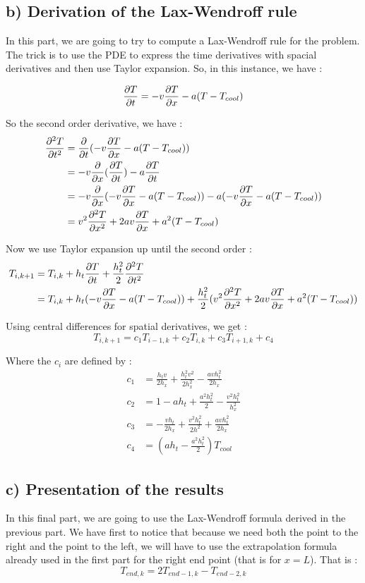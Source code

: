 \subsection*{b) Derivation of the Lax-Wendroff rule}
In this part, we are going to try to compute a Lax-Wendroff rule for the problem. The trick is to use the PDE to express the time derivatives with spacial derivatives and then use Taylor expansion. So, in this instance, we have :

$$\frac{\partial T}{\partial t}=-v\frac{\partial T}{\partial x}-a(T-T_{cool})$$

So the second order derivative, we have :
\begin{align*}
\frac{\partial^2T}{\partial t^2} &= \frac{\partial}{\partial t}( -v\frac{\partial T}{\partial x}-a(T-T_{cool}))\\
&=-v\frac{\partial}{\partial x}(\frac{\partial T}{\partial t})-a\frac{\partial T}{\partial t}\\
&=-v\frac{\partial}{\partial x}(-v\frac{\partial T}{\partial x}-a(T-T_{cool})) - a(-v\frac{\partial T}{\partial x}-a(T-T_{cool}))\\
&=v^2\frac{\partial^2 T}{\partial x^2}+2av\frac{\partial T}{\partial x}+a^2(T-T_{cool})
\end{align*}

Now we use Taylor expansion up until the second order : 
\begin{align*}
T_{i,k+1} &= T_{i,k}+h_t \frac{\partial T}{\partial t}+\frac{h_t^2}{2}\frac{\partial^2 T}{\partial t^2}\\
&=T_{i,k}+h_t(-v\frac{\partial T}{\partial x}-a(T-T_{cool}))+\frac{h_t^2}{2}(v^2\frac{\partial^2 T}{\partial x^2}+2av\frac{\partial T}{\partial x}+a^2(T-T_{cool})) 
\end{align*}

Using central differences for spatial derivatives, we get : 
$$T_{i,k+1} = c_1T_{i-1,k}+c_2T_{i,k}+c_3T_{i+1,k}+c_4$$

Where the $c_i$ are defined by : 
\begin{align*}
c_1 &= \frac{h_tv}{2h_x}+\frac{h_t^2v^2}{2h_x^2}-\frac{avh_t^2}{2h_x}\\
c_2 &=1-ah_t+\frac{a^2h_t^2}{2}-\frac{v^2h_t^2}{h_x^2}\\
c_3 &= -\frac{vh_t}{2h_x}+\frac{v^2h_t^2}{2h^2}+\frac{avh_t^2}{2h_x}\\
c_4 &= (ah_t - \frac{a^2h_t^2}{2})T_{cool}
\end{align*}

\subsection*{c) Presentation of the results}
In this final part, we are going to use the Lax-Wendroff formula derived in the previous part. We have first to notice that because we need both the point to the right and the point to the left, we will have to use the extrapolation formula already used in the first part for the right end point (that is for $x=L$). That is : 
$$T_{end,k} = 2T_{end-1,k}-T_{end-2,k}$$

